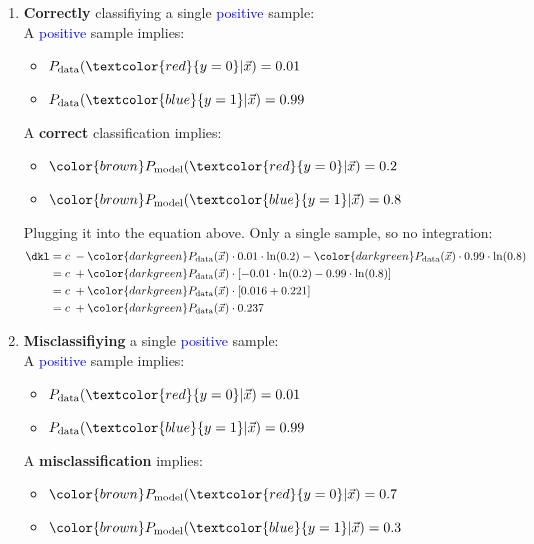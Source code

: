 \begin{enumerate}
\item \textbf{Correctly} classifiying a single \textcolor{blue}{positive} sample:\\
	A \textcolor{blue}{positive} sample implies:
	\begin{itemize}
	\item $P_{\text{data}}(\textcolor{red}{y=0} | \vec x) = 0.01$
	\item $P_{\text{data}}(\textcolor{blue}{y=1} | \vec x) = 0.99$
	\end{itemize}
	A \textbf{correct} classification implies:
	\begin{itemize}
	\item ${\color{brown} P_{\text{model}}(\textcolor{red}{y=0} | \vec x) } = 0.2$
	\item ${\color{brown} P_{\text{model}}(\textcolor{blue}{y=1} | \vec x) } = 0.8$
	\end{itemize}
	Plugging it into the equation above. Only a single sample, so no integration:
	\begin{align}
\dkl
&= c \; -
		{ \color{darkgreen} P_{\text{data}}(\vec x) }
		\cdot
		0.01 \cdot 
			\ln(0.2)
		-
		{ \color{darkgreen} P_{\text{data}}(\vec x) }
		\cdot
		0.99 \cdot 
			\ln(0.8)\\
&= c \; +
		{ \color{darkgreen} P_{\text{data}}(\vec x) }
		\cdot
		\lbrack
		-0.01 \cdot 
			\ln(0.2)
		-0.99 \cdot 
			\ln(0.8)
		\rbrack\\
&= c \; +
		{ \color{darkgreen} P_{\text{data}}(\vec x) }
		\cdot
		\lbrack
		0.016 + 0.221
		\rbrack\\
&= c \; +
		{ \color{darkgreen} P_{\text{data}}(\vec x) }
		\cdot
		0.237
	\end{align}
\item \textbf{Misclassifiying} a single \textcolor{blue}{positive} sample:\\
	A \textcolor{blue}{positive} sample implies:
	\begin{itemize}
	\item $P_{\text{data}}(\textcolor{red}{y=0} | \vec x) = 0.01$
	\item $P_{\text{data}}(\textcolor{blue}{y=1} | \vec x) = 0.99$
	\end{itemize}
	A \textbf{misclassification} implies:
	\begin{itemize}
	\item ${\color{brown} P_{\text{model}}(\textcolor{red}{y=0} | \vec x) } = 0.7$
	\item ${\color{brown} P_{\text{model}}(\textcolor{blue}{y=1} | \vec x) } = 0.3$

\end{itemize}
\end{enumerate}
